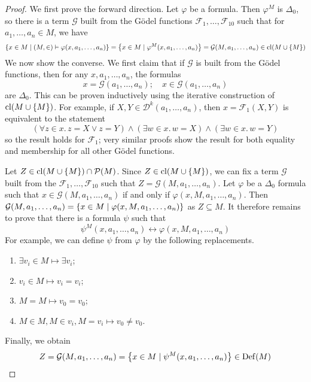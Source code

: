 \begin{proof}
    We first prove the forward direction.
    Let \( \varphi \) be a formula.
    Then \( \varphi^M \) is \( \Delta_0 \), so there is a term \( \mathcal G \) built from the G\"odel functions \( \mathcal F_1, \dots, \mathcal F_{10} \) such that for \( a_1, \dots, a_n \in M \), we have
    \[ \qty{x \in M \mid (M, \in) \vDash \varphi(x, a_1, \dots, a_n)} = \qty{x \in M \mid \varphi^M(x, a_1, \dots, a_n)} = \mathcal G(M, a_1, \dots, a_n) \in \mathrm{cl}(M \cup \qty{M}) \]
    We now show the converse.
    We first claim that if \( \mathcal G \) is built from the G\"odel functions, then for any \( x, a_1, \dots, a_n \), the formulas
    \[ x = \mathcal G(a_1, \dots, a_n);\quad x \in \mathcal G(a_1, \dots, a_n) \]
    are \( \Delta_0 \).
    This can be proven inductively using the iterative construction of \( \mathrm{cl}(M \cup \qty{M}) \).
    For example, if \( X, Y \in \mathcal D^k(a_1, \dots, a_n) \), then \( x = \mathcal F_1(X, Y) \) is equivalent to the statement
    \[ (\forall z \in x.\, z = X \vee z = Y) \wedge (\exists w \in x.\, w = X) \wedge (\exists w \in x.\, w = Y) \]
    so the result holds for \( \mathcal F_1 \); very similar proofs show the result for both equality and membership for all other G\"odel functions.

    Let \( Z \in \mathrm{cl}(M \cup \qty{M}) \cap \mathcal P(M) \).
    Since \( Z \in \mathrm{cl}(M \cup \qty{M}) \), we can fix a term \( \mathcal G \) built from the \( \mathcal F_1, \dots, \mathcal F_{10} \) such that \( Z = \mathcal G(M, a_1, \dots, a_n) \).
    Let \( \varphi \) be a \( \Delta_0 \) formula such that \( x \in \mathcal G(M, a_1, \dots, a_n) \) if and only if \( \varphi(x, M, a_1, \dots, a_n) \).
    Then \( \mathcal G(M, a_1, \dots, a_n) = \qty{x \in M \mid \varphi(x, M, a_1, \dots, a_n)} \) as \( Z \subseteq M \).
    It therefore remains to prove that there is a formula \( \psi \) such that
    \[ \psi^M(x, a_1, \dots, a_n) \leftrightarrow \varphi(x, M, a_1, \dots, a_n) \]
    For example, we can define \( \psi \) from \( \varphi \) by the following replacements.
    \begin{enumerate}
        \item \( \exists v_i \in M \mapsto \exists v_i \);
        \item \( v_i \in M \mapsto v_i = v_i \);
        \item \( M = M \mapsto v_0 = v_0 \);
        \item \( M \in M, M \in v_i, M = v_i \mapsto v_0 \neq v_0 \).
    \end{enumerate}
    Finally, we obtain
    \[ Z = \mathcal G(M, a_1, \dots, a_n) = \qty{x \in M \mid \psi^M(x, a_1, \dots, a_n)} \in \operatorname{Def}(M) \]
\end{proof}

